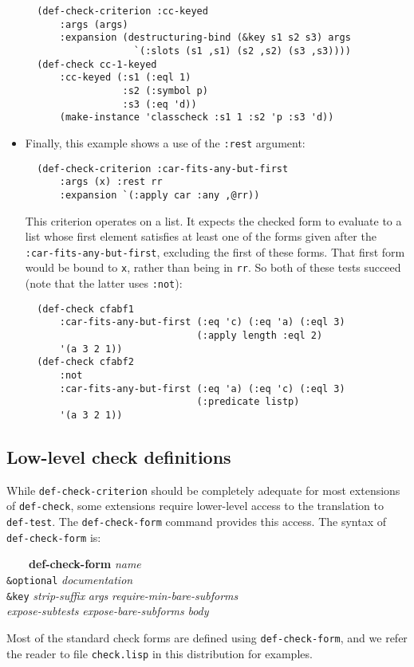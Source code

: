 \documentclass{article}
\begin{document}
\begin{itemize}
\begin{verbatim}
  (def-check-criterion :cc-keyed
      :args (args)
      :expansion (destructuring-bind (&key s1 s2 s3) args
                   `(:slots (s1 ,s1) (s2 ,s2) (s3 ,s3))))
  (def-check cc-1-keyed
      :cc-keyed (:s1 (:eql 1)
                 :s2 (:symbol p)
                 :s3 (:eq 'd))
      (make-instance 'classcheck :s1 1 :s2 'p :s3 'd))
\end{verbatim}
\item Finally, this example shows a use of the \texttt{:rest}
  argument:
\begin{verbatim}
  (def-check-criterion :car-fits-any-but-first
      :args (x) :rest rr
      :expansion `(:apply car :any ,@rr))
\end{verbatim}
  This criterion operates on a list.  It expects the checked form to
  evaluate to a list whose first element satisfies at least one of the
  forms given after the \texttt{:car-fits-any-but-first}, excluding
  the first of these forms.  That first form would be bound to
  \texttt{x}, rather than being in \texttt{rr}.  So both of these
  tests succeed (note that the latter uses \texttt{:not}):
\begin{verbatim}
  (def-check cfabf1
      :car-fits-any-but-first (:eq 'c) (:eq 'a) (:eql 3)
                              (:apply length :eql 2)
      '(a 3 2 1))
  (def-check cfabf2
      :not
      :car-fits-any-but-first (:eq 'a) (:eq 'c) (:eql 3)
                              (:predicate listp)
      '(a 3 2 1))
\end{verbatim}
\end{itemize}

\subsection{Low-level check definitions}
While \texttt{def-check-criterion} should be completely adequate for
most extensions of \texttt{def-check}, some extensions require
lower-level access to the translation to \texttt{def-test}.  The
\texttt{def-check-form} command provides this access.  The syntax of
\texttt{def-check-form} is:
\begin{tabbing}
  ~~~~\textbf{def-}\=\textbf{check-form} \textit{name}
  \\ \> \texttt{\&optional} \textit{documentation}
  \\ \> \texttt{\&key} \= \textit{strip-suffix} \textit{args}
  \textit{require-min-bare-subforms}
  \\ \> \>  \textit{expose-subtests} \textit{expose-bare-subforms} \textit{body}
\end{tabbing}
Most of the standard check forms are defined using
\texttt{def-check-form}, and we refer the reader to file
\texttt{check.lisp} in this distribution for examples.
\end{document}
